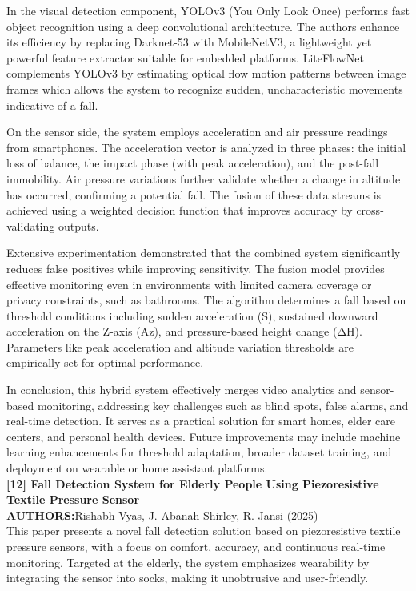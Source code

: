 \documentclass[a4paper, 12pt]{report}
\begin{document}
In the visual detection component, YOLOv3 (You Only Look Once) performs fast object recognition using a deep convolutional architecture. The authors enhance its efficiency by replacing Darknet-53 with MobileNetV3, a lightweight yet powerful feature extractor suitable for embedded platforms. LiteFlowNet complements YOLOv3 by estimating optical flow motion patterns between image frames which allows the system to recognize sudden, uncharacteristic movements indicative of a fall.

On the sensor side, the system employs acceleration and air pressure readings from smartphones. The acceleration vector is analyzed in three phases: the initial loss of balance, the impact phase (with peak acceleration), and the post-fall immobility. Air pressure variations further validate whether a change in altitude has occurred, confirming a potential fall. The fusion of these data streams is achieved using a weighted decision function that improves accuracy by cross-validating outputs.

Extensive experimentation demonstrated that the combined system significantly reduces false positives while improving sensitivity. The fusion model provides effective monitoring even in environments with limited camera coverage or privacy constraints, such as bathrooms. The algorithm determines a fall based on threshold conditions including sudden acceleration (S), sustained downward acceleration on the Z-axis (Az), and pressure-based height change (ΔH). Parameters like peak acceleration and altitude variation thresholds are empirically set for optimal performance.

In conclusion, this hybrid system effectively merges video analytics and sensor-based monitoring, addressing key challenges such as blind spots, false alarms, and real-time detection. It serves as a practical solution for smart homes, elder care centers, and personal health devices. Future improvements may include machine learning enhancements for threshold adaptation, broader dataset training, and deployment on wearable or home assistant platforms.\\
\noindent\textbf{[12] Fall Detection System for Elderly People Using Piezoresistive Textile Pressure Sensor}\\
\textbf{AUTHORS:}Rishabh Vyas, J. Abanah Shirley, R. Jansi (2025)\\
This paper presents a novel fall detection solution based on piezoresistive textile pressure sensors, with a focus on comfort, accuracy, and continuous real-time monitoring. Targeted at the elderly, the system emphasizes wearability by integrating the sensor into socks, making it unobtrusive and user-friendly.
\end{document}
